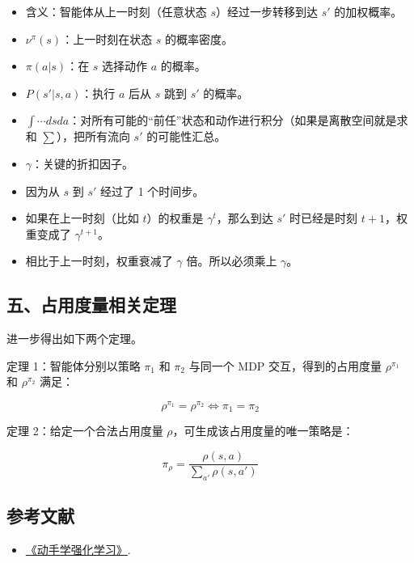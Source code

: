 \begin{itemize}
\tightlist
\item
  含义：智能体从上一时刻（任意状态 \(s\)）经过一步转移到达 \(s'\) 的加权概率。
\item
  \(\nu^\pi(s)\)：上一时刻在状态 \(s\) 的概率密度。
\item
  \(\pi(a|s)\)：在 \(s\) 选择动作 \(a\) 的概率。
\item
  \(P(s'|s,a)\)：执行 \(a\) 后从 \(s\) 跳到 \(s'\) 的概率。
\item
  \(\int \cdots dsda\)：对所有可能的``前任''状态和动作进行积分（如果是离散空间就是求和 \(\sum\)），把所有流向 \(s'\) 的可能性汇总。
\item
  \(\gamma\)：关键的折扣因子。
\item
  因为从 \(s\) 到 \(s'\) 经过了 1 个时间步。
\item
  如果在上一时刻（比如 \(t\)）的权重是 \(\gamma^t\)，那么到达 \(s'\) 时已经是时刻 \(t+1\)，权重变成了 \(\gamma^{t+1}\)。
\item
  相比于上一时刻，权重衰减了 \(\gamma\) 倍。所以必须乘上 \(\gamma\)。
\end{itemize}

\hypertarget{ux4e94ux5360ux7528ux5ea6ux91cfux76f8ux5173ux5b9aux7406}{%
\subsection{五、占用度量相关定理}\label{ux4e94ux5360ux7528ux5ea6ux91cfux76f8ux5173ux5b9aux7406}}

进一步得出如下两个定理。

定理 1：智能体分别以策略 \(\pi_1\) 和 \(\pi_2\) 与同一个 MDP 交互，得到的占用度量 \(\rho^{\pi_1}\) 和 \(\rho^{\pi_2}\) 满足：

\[
\rho^{\pi_1} = \rho^{\pi_2} \Longleftrightarrow \pi_1 = \pi_2
\]

定理 2：给定一个合法占用度量 \(\rho\)，可生成该占用度量的唯一策略是：

\[
\pi_\rho = \frac{\rho(s,a)}{\sum_{a'}\rho(s,a')}
\]

\hypertarget{ux53c2ux8003ux6587ux732e-44}{%
\subsection{参考文献}\label{ux53c2ux8003ux6587ux732e-44}}

\vspace{0.25em}
\begin{itemize}
\tightlist
\item
  \href{https://hrl.boyuai.com/}{《动手学强化学习》}.
\end{itemize}


